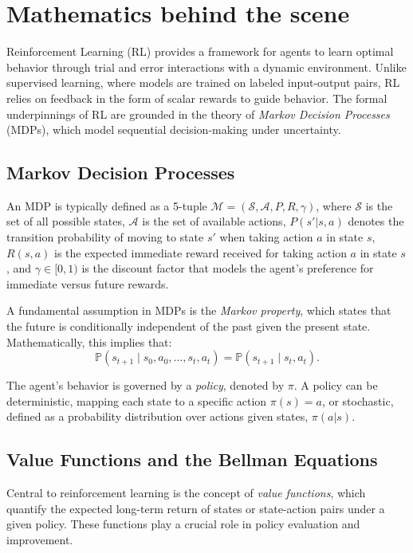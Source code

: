 \section{Mathematics behind the scene}

Reinforcement Learning (RL) provides a framework for agents to learn optimal behavior through trial and error interactions with a dynamic environment. Unlike supervised learning, where models are trained on labeled input-output pairs, RL relies on feedback in the form of scalar rewards to guide behavior. The formal underpinnings of RL are grounded in the theory of \textit{Markov Decision Processes} (MDPs), which model sequential decision-making under uncertainty.

\subsection{Markov Decision Processes}

An MDP is typically defined as a 5-tuple $\mathcal{M} = (\mathcal{S}, \mathcal{A}, P, R, \gamma)$, where $\mathcal{S}$ is the set of all possible states, $\mathcal{A}$ is the set of available actions, $P(s'|s, a)$ denotes the transition probability of moving to state $s'$ when taking action $a$ in state $s$, $R(s, a)$ is the expected immediate reward received for taking action $a$ in state $s$, and $\gamma \in [0,1)$ is the discount factor that models the agent’s preference for immediate versus future rewards.

A fundamental assumption in MDPs is the \textit{Markov property}, which states that the future is conditionally independent of the past given the present state. Mathematically, this implies that:
\[
\mathbb{P}(s_{t+1} \mid s_0, a_0, \dots, s_t, a_t) = \mathbb{P}(s_{t+1} \mid s_t, a_t).
\]

The agent's behavior is governed by a \textit{policy}, denoted by $\pi$. A policy can be deterministic, mapping each state to a specific action $\pi(s) = a$, or stochastic, defined as a probability distribution over actions given states, $\pi(a|s)$.

\subsection{Value Functions and the Bellman Equations}

Central to reinforcement learning is the concept of \textit{value functions}, which quantify the expected long-term return of states or state-action pairs under a given policy. These functions play a crucial role in policy evaluation and improvement.

